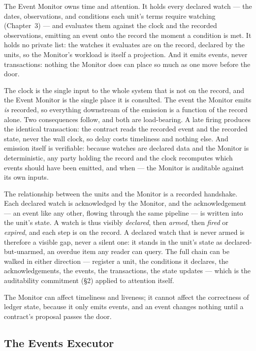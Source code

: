 The Event Monitor owns time and attention. It holds every declared watch ---
the dates, observations, and conditions each unit's terms require watching
(Chapter~3) --- and evaluates them against the clock and the recorded
observations, emitting an event onto the record the moment a condition is met.
It holds no private list: the watches it evaluates are on the record, declared
by the units, so the Monitor's workload is itself a projection. And it emits
events, never transactions: nothing the Monitor does can place so much as one
move before the door.

The clock is the single input to the whole system that is not on the record,
and the Event Monitor is the single place it is consulted. The event the
Monitor emits \emph{is} recorded, so everything downstream of the emission is a
function of the record alone. Two consequences follow, and both are
load-bearing. A late firing produces the identical transaction: the contract
reads the recorded event and the recorded state, never the wall clock, so delay
costs timeliness and nothing else. And emission itself is verifiable: because
watches are declared data and the Monitor is deterministic, any party holding
the record and the clock recomputes which events should have been emitted, and
when --- the Monitor is auditable against its own inputs.

The relationship between the units and the Monitor is a recorded handshake.
Each declared watch is acknowledged by the Monitor, and the acknowledgement ---
an event like any other, flowing through the same pipeline --- is written into
the unit's state. A watch is thus visibly \emph{declared}, then \emph{armed},
then \emph{fired} or \emph{expired}, and each step is on the record. A declared
watch that is never armed is therefore a visible gap, never a silent one: it
stands in the unit's state as declared-but-unarmed, an overdue item any reader
can query. The full chain can be walked in either direction --- register a
unit, the conditions it declares, the acknowledgements, the events, the
transactions, the state updates --- which is the auditability commitment
(\S2) applied to attention itself.

The Monitor can affect timeliness and liveness; it cannot affect the
correctness of ledger state, because it only emits events, and an event changes
nothing until a contract's proposal passes the door.

\subsection{The Events Executor}

